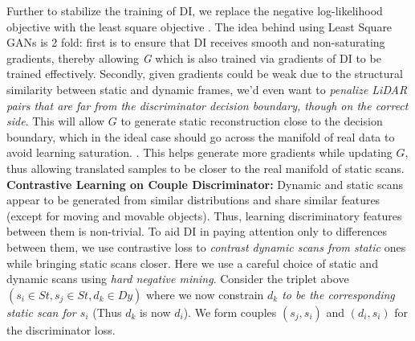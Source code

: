 \documentclass[10pt,twocolumn,letterpaper]{article}
\begin{document}
Further to stabilize the training of DI, we replace the negative log-likelihood objective with the least square objective \cite{mao2017least}. The idea behind using Least Square GANs is 2 fold: first is to ensure that DI receives smooth and non-saturating gradients, thereby allowing \textit{G} which is also trained via gradients of DI to be trained effectively. Secondly, given gradients could be weak due to the structural similarity between static and dynamic frames, we'd even want to \textit{penalize LiDAR pairs that are far from the discriminator decision boundary,  though on the correct side}. This will allow $G$ to generate static reconstruction close to the decision boundary, which in the ideal case should go across the manifold of real data to avoid learning saturation. \cite{mao2017least}.  This helps generate more gradients while updating $G$, thus allowing translated samples to be closer to the real manifold of static scans.\\
\textbf{Contrastive Learning on Couple Discriminator:} Dynamic and static scans appear to be generated from similar distributions and share similar features (except for moving and movable objects). Thus, learning discriminatory features between them is non-trivial. To aid DI in paying attention only to differences between them, we use contrastive loss to \textit{contrast dynamic scans from static} ones while bringing static scans closer. Here we use a careful choice of static and dynamic scans using \textit{hard negative mining}. Consider the triplet above $(s_i\in St, s_j\in St, d_k\in Dy)$ where we now constrain \textit{$d_k$ to be the corresponding static scan for $s_{i}$} (Thus $d_{k}$ is now $d_{i}$). We form couples $(s_j, s_i)$ and $(d_i, s_i)$ for the discriminator loss.\\
\end{document}
